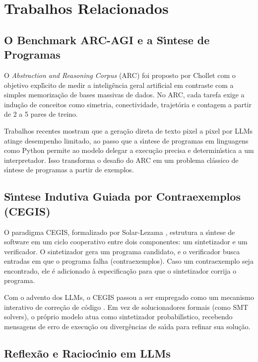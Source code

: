 \section{Trabalhos Relacionados}
\label{sec:relacionados}

\subsection{O Benchmark ARC-AGI e a S\'{\i}ntese de Programas}

O \textit{Abstraction and Reasoning Corpus} (ARC) foi proposto por Chollet \cite{chollet2019measure} com o objetivo expl\'{\i}cito de medir a intelig\^{e}ncia geral artificial em contraste com a simples memoriza\c{c}\~{a}o de bases massivas de dados. No ARC, cada tarefa exige a indu\c{c}\~{a}o de conceitos como simetria, conectividade, trajet\'{o}ria e contagem a partir de 2 a 5 pares de treino. 

Trabalhos recentes mostram que a gera\c{c}\~{a}o direta de texto pixel a pixel por LLMs atinge desempenho limitado, ao passo que a s\'{\i}ntese de programas em linguagens como Python \cite{greenblatt2024getting} permite ao modelo delegar a execu\c{c}\~{a}o precisa e determin\'{\i}stica a um interpretador. Isso transforma o desafio do ARC em um problema cl\'{a}ssico de s\'{\i}ntese de programas a partir de exemplos.

\subsection{S\'{\i}ntese Indutiva Guiada por Contraexemplos (CEGIS)}

O paradigma CEGIS, formalizado por Solar-Lezama \cite{solar2008program}, estrutura a s\'{\i}ntese de software em um ciclo cooperativo entre dois componentes: um sintetizador e um verificador. O sintetizador gera um programa candidato, e o verificador busca entradas em que o programa falha (contraexemplos). Caso um contraexemplo seja encontrado, ele \'{e} adicionado \`{a} especifica\c{c}\~{a}o para que o sintetizador corrija o programa.

Com o advento dos LLMs, o CEGIS passou a ser empregado como um mecanismo interativo de corre\c{c}\~{a}o de c\'{o}digo \cite{poesia2024program}. Em vez de solucionadores formais (como SMT solvers), o pr\'{o}prio modelo atua como sintetizador probabil\'{\i}stico, recebendo mensagens de erro de execu\c{c}\~{a}o ou diverg\^{e}ncias de sa\'{\i}da para refinar sua solu\c{c}\~{a}o.

\subsection{Reflex\~{a}o e Racioc\'{\i}nio em LLMs}

